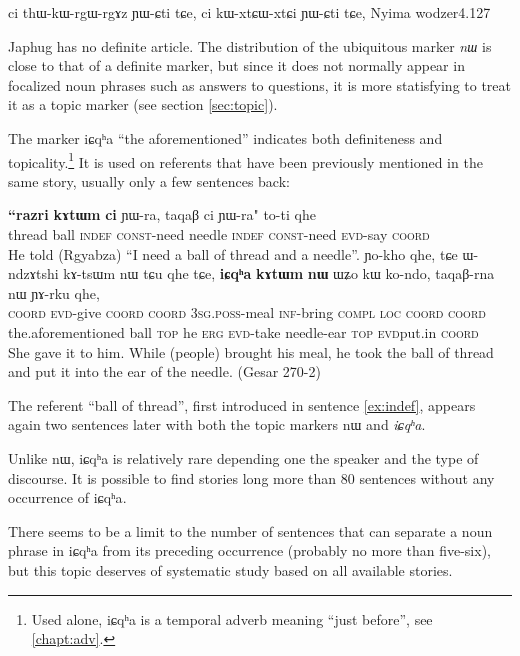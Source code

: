 \documentclass[oldfontcommands,oneside,a4paper,11pt]{memoir}
\newcommand{\ipa}[1]{{\phon #1}} %
\newcommand{\coord}{\textsc{coord}}
\newcommand{\const}{\textsc{const}}
\newcommand{\erg}{\textsc{erg}}
\newcommand{\evd}{\textsc{evd}}
\newcommand{\inftv}{\textsc{inf}}
\newcommand{\loc}{\textsc{loc}}
\newcommand{\poss}{\textsc{poss}}
\newcommand{\sg}{\textsc{sg}}
\newcommand{\topic}{\textsc{top}}
\begin{document}
ci thɯ-kɯ-rgɯ-rgɤz ɲɯ-ɕti tɕe, ci kɯ-xtɕɯ-xtɕi ɲɯ-ɕti tɕe,
Nyima wodzer4.127

Japhug has no definite article. The distribution of the ubiquitous marker \textit{nɯ} is close to that of a definite marker, but since it does not normally appear in focalized noun phrases such as answers to questions,  it is more statisfying to treat it as a topic marker (see section \ref{sec:topic}).

The marker  \ipa{iɕqʰa} ``the aforementioned'' indicates both definiteness and topicality.\footnote{Used alone, \ipa{iɕqʰa} is a temporal adverb meaning ``just before'', see \ref{chapt:adv}.} It is used on referents that have been previously mentioned in the same story, usually only a few sentences back:
  \begin{exe}
\ex \label{ex:indef}
\gll \textbf{\ipa{``razri}} 	\textbf{\ipa{kɤtɯm}} 	\textbf{\ipa{ci}} 	\ipa{ɲɯ-ra,} 	\ipa{taqaβ} 	\ipa{ci} 	\ipa{ɲɯ-ra"} \ipa{to-ti} \ipa{qhe}   \\
 thread ball \textsc{indef} \const{}-need needle \textsc{indef} \const{}-need \evd{}-say \coord{}  \\
\glt He told (Rgyabza) ``I need a ball of thread and a needle''.
\ex \label{ex:icqha}
\gll \ipa{tɕendɤre} 	\ipa{ɲo-kho} 	\ipa{qhe,} 	\ipa{tɕe} 	\ipa{ɯ-ndzɤtshi} 	\ipa{kɤ-tsɯm} 	\ipa{nɯ} 	\ipa{tɕu} 	\ipa{qhe} 	\ipa{tɕe,} \textbf{\ipa{iɕqʰa}} 	\textbf{\ipa{kɤtɯm}} 	\textbf{\ipa{nɯ} }	\ipa{ɯʑo} 	\ipa{kɯ} 	\ipa{ko-ndo,} 	\ipa{taqaβ-rna} 	\ipa{nɯ} 	\ipa{ɲɤ-rku} \ipa{qhe,}  \\
 \coord{} \evd{}-give \coord{} \coord{} 3\sg{}.\poss{}-meal \inftv{}-bring \textsc{compl}  \loc{} \coord{} \coord{} the.aforementioned ball \topic{} he \erg{} \evd{}-take needle-ear \topic{} \evd{}put.in \coord{} \\
\glt She gave it to him. While (people) brought his meal, he took the ball of thread and put it into the ear of the needle. (Gesar 270-2)
\end{exe}
The referent ``ball of thread'', first introduced in sentence \ref{ex:indef}, appears again two sentences later with both the topic markers \ipa{nɯ} and \textit{iɕqʰa}. 

Unlike \ipa{nɯ}, \ipa{iɕqʰa} is relatively rare depending one the speaker and the type of discourse. It is possible to find stories long more than 80 sentences without any occurrence of \ipa{iɕqʰa}. 

There seems to be a limit to the number of sentences that can separate a noun phrase in \ipa{iɕqʰa} from its preceding occurrence (probably no more than five-six), but this topic deserves of systematic study based on all available stories.
\end{document}
